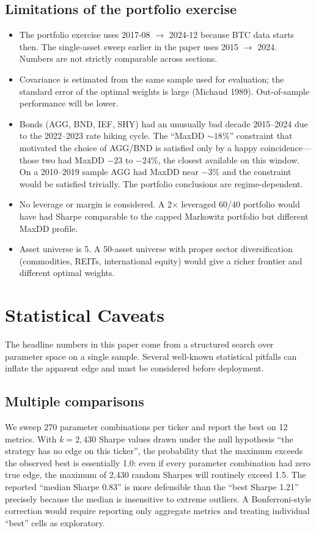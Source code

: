 \documentclass[11pt,a4paper]{article}
\begin{document}
\subsection{Limitations of the portfolio exercise}

\begin{itemize}
\item The portfolio exercise uses 2017-08 $\to$ 2024-12 because BTC data starts then. The single-asset sweep earlier in the paper uses 2015 $\to$ 2024. Numbers are not strictly comparable across sections.
\item Covariance is estimated from the same sample used for evaluation; the standard error of the optimal weights is large (Michaud 1989). Out-of-sample performance will be lower.
\item Bonds (AGG, BND, IEF, SHY) had an unusually bad decade 2015--2024 due to the 2022--2023 rate hiking cycle. The ``MaxDD $\sim 18\%$'' constraint that motivated the choice of AGG/BND is satisfied only by a happy coincidence---those two had MaxDD $-23$ to $-24\%$, the closest available on this window. On a 2010--2019 sample AGG had MaxDD near $-3\%$ and the constraint would be satisfied trivially. The portfolio conclusions are regime-dependent.
\item No leverage or margin is considered. A 2$\times$ leveraged 60/40 portfolio would have had Sharpe comparable to the capped Markowitz portfolio but different MaxDD profile.
\item Asset universe is 5. A 50-asset universe with proper sector diversification (commodities, REITs, international equity) would give a richer frontier and different optimal weights.
\end{itemize}

\section{Statistical Caveats}

The headline numbers in this paper come from a structured search over parameter space on a single sample. Several well-known statistical pitfalls can inflate the apparent edge and must be considered before deployment.

\subsection{Multiple comparisons}

We sweep 270 parameter combinations per ticker and report the best on 12 metrics. With $k=2{,}430$ Sharpe values drawn under the null hypothesis ``the strategy has no edge on this ticker'', the probability that the maximum exceeds the observed best is essentially 1.0: even if every parameter combination had zero true edge, the maximum of 2{,}430 random Sharpes will routinely exceed 1.5. The reported ``median Sharpe 0.83'' is more defensible than the ``best Sharpe 1.21'' precisely because the median is insensitive to extreme outliers. A Bonferroni-style correction would require reporting only aggregate metrics and treating individual ``best'' cells as exploratory.
\end{document}
